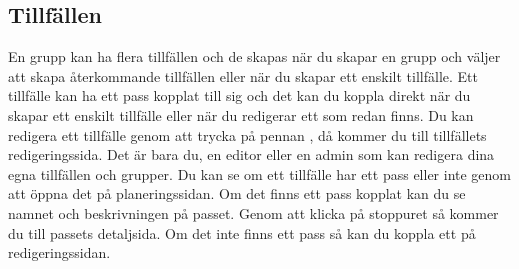 \documentclass{article}
\newcommand*{\img}[1]{%
    \raisebox{-.3\baselineskip}{%
        \texttt{[image: \#1]}%
    }%
}
\begin{document}
{    \subsection{Tillfällen}
        En grupp kan ha flera tillfällen och de skapas när du skapar en grupp och väljer att skapa återkommande tillfällen eller när du skapar ett enskilt tillfälle. Ett tillfälle kan ha ett pass kopplat till sig och det kan du koppla direkt när du skapar ett enskilt tillfälle eller när du redigerar ett som redan finns. Du kan redigera ett tillfälle genom att trycka på pennan \img{images/icons ref/pencil}, då kommer du till tillfällets redigeringssida. Det är bara du, en editor eller en admin som kan redigera dina egna tillfällen och grupper. Du kan se om ett tillfälle har ett pass eller inte genom att öppna det på planeringssidan. Om det finns ett pass kopplat kan du se namnet och beskrivningen på passet. Genom att klicka på stoppuret \img{images/icons ref/stopwatch.png} så kommer du till passets detaljsida. Om det inte finns ett pass så kan du koppla ett på redigeringssidan.

    \newpage
}
\end{document}
